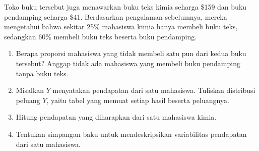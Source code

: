 \begin{exercisewrap}
\begin{nexercise}
Toko buku tersebut juga menawarkan buku teks kimia seharga \$159 dan buku pendamping seharga \$41. Berdasarkan pengalaman sebelumnya, mereka mengetahui bahwa sekitar 25\% mahasiswa kimia hanya membeli buku teks, sedangkan 60\% membeli buku teks beserta buku pendamping.\footnotemark
\begin{enumerate}
\item[(a)] Berapa proporsi mahasiswa yang tidak membeli satu pun dari kedua buku tersebut? Anggap tidak ada mahasiswa yang membeli buku pendamping tanpa buku teks.
\item[(b)] Misalkan $Y$ menyatakan pendapatan dari satu mahasiswa. Tuliskan distribusi peluang $Y$, yaitu tabel yang memuat setiap hasil beserta peluangnya.
\item[(c)] Hitung pendapatan yang diharapkan dari satu mahasiswa kimia. 
\item[(d)] Tentukan simpangan baku untuk mendeskripsikan variabilitas pendapatan dari satu mahasiswa.
\end{enumerate}
\end{nexercise}
\end{exercisewrap}


